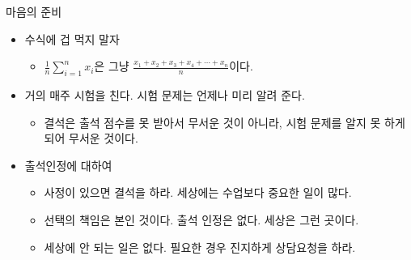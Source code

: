 \documentclass{beamer}
\begin{document}
\begin{frame}{마음의 준비}

\begin{itemize}
\item 수식에 겁 먹지 말자
	\begin{itemize}
		\item $ \frac{1}{n} \sum_{i=1}^{n} x_i $은 그냥 $ \frac{x_1 + x_2 + x_3 + x_4 + \cdots + x_n}{n}$이다. 
	\end{itemize}
\item 거의 매주 시험을 친다. 시험 문제는 언제나 미리 알려 준다. 
	\begin{itemize}
		\item 결석은 출석 점수를 못 받아서 무서운 것이 아니라, 시험 문제를 알지 못 하게 되어 무서운 것이다.
	\end{itemize}
\item 출석인정에 대하여
	\begin{itemize}
		\item 사정이 있으면 결석을 하라. 세상에는 수업보다 중요한 일이 많다.
		\item 선택의 책임은 본인 것이다. 출석 인정은 없다. 세상은 그런 곳이다.
		\item 세상에 안 되는 일은 없다. 필요한 경우 진지하게 상담요청을 하라.
	\end{itemize}
\end{itemize}

\end{frame}
\end{document}
